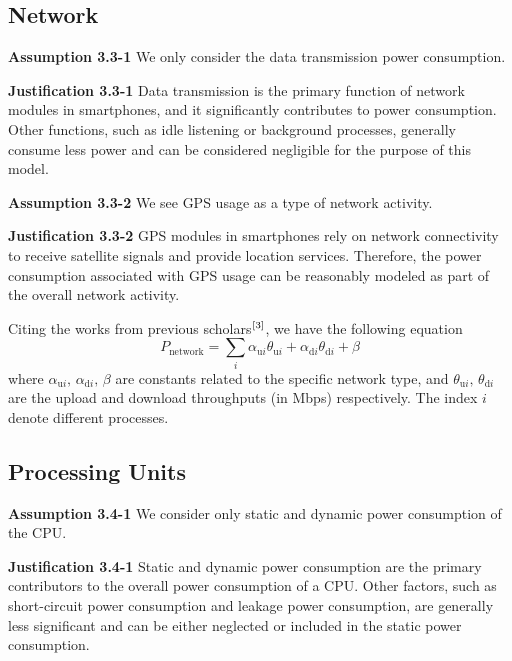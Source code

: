 \documentclass[12pt]{article}
\begin{document}
\subsection{Network}

\noindent \textbf{Assumption 3.3-1} \quad We only consider the data transmission power consumption.

\noindent \textbf{Justification 3.3-1} \quad Data transmission is the primary function of network modules in smartphones, and it significantly contributes to power consumption. Other functions, such as idle listening or background processes, generally consume less power and can be considered negligible for the purpose of this model.

\noindent \textbf{Assumption 3.3-2} \quad We see GPS usage as a type of network activity.

\noindent \textbf{Justification 3.3-2} \quad GPS modules in smartphones rely on network connectivity to receive satellite signals and provide location services. Therefore, the power consumption associated with GPS usage can be reasonably modeled as part of the overall network activity.
\\
\par Citing the works from previous scholars$\rm ^{[3]}$, we have the following equation
\begin{equation}
	P_{\mathrm {network}}=\sum_i \alpha_{\mathrm ui}\theta_{\mathrm ui}+\alpha_{\mathrm di}\theta_{\mathrm di}+\beta
\end{equation}
where $\alpha_{\mathrm ui},\,\alpha_{\mathrm di},\,\beta$ are constants related to the specific network type, and $\theta_{\mathrm ui},\,\theta_{\mathrm di}$ are the upload and download throughputs (in Mbps) respectively. The index $i$ denote different processes.

\subsection{Processing Units}

\noindent \textbf{Assumption 3.4-1} \quad We consider only static and dynamic power consumption of the CPU.

\noindent \textbf{Justification 3.4-1} \quad Static and dynamic power consumption are the primary contributors to the overall power consumption of a CPU. Other factors, such as short-circuit power consumption and leakage power consumption, are generally less significant and can be either neglected or included in the static power consumption.
\end{document}
